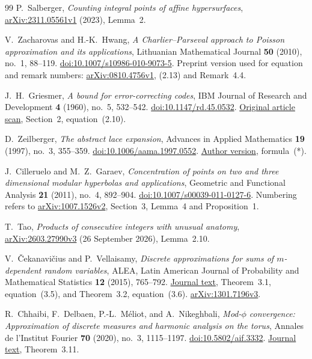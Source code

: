 \begin{thebibliography}{99}
P.~Salberger,
\emph{Counting integral points of affine hypersurfaces},
\href{https://arxiv.org/abs/2311.05561v1}
{arXiv:2311.05561v1} (2023), Lemma~2.

V.~Zacharovas and H.-K.~Hwang,
\emph{A Charlier--Parseval approach to Poisson approximation
and its applications},
Lithuanian Mathematical Journal \textbf{50} (2010), no.~1,
88--119.
\href{https://doi.org/10.1007/s10986-010-9073-5}
{doi:10.1007/s10986-010-9073-5}.
Preprint version used for equation and remark numbers:
\href{https://arxiv.org/abs/0810.4756v1}
{arXiv:0810.4756v1}, (2.13) and Remark~4.4.

J.~H.~Griesmer,
\emph{A bound for error-correcting codes},
IBM Journal of Research and Development \textbf{4} (1960),
no.~5, 532--542.
\href{https://doi.org/10.1147/rd.45.0532}
{doi:10.1147/rd.45.0532}.
\href{https://bitsavers.trailing-edge.com/pdf/ibm/IBM_Journal_of_Research_and_Development/045/ibmrd0405M.pdf}
{Original article scan}, Section~2, equation~(2.10).

D.~Zeilberger,
\emph{The abstract lace expansion},
Advances in Applied Mathematics \textbf{19} (1997),
no.~3, 355--359.
\href{https://doi.org/10.1006/aama.1997.0552}
{doi:10.1006/aama.1997.0552}.
\href{https://sites.math.rutgers.edu/~zeilberg/mamarim/mamarimPDF/lace.pdf}
{Author version}, formula~(*).

J.~Cilleruelo and M.~Z.~Garaev,
\emph{Concentration of points on two and three dimensional
modular hyperbolas and applications},
Geometric and Functional Analysis \textbf{21} (2011),
no.~4, 892--904.
\href{https://doi.org/10.1007/s00039-011-0127-6}
{doi:10.1007/s00039-011-0127-6}.
Numbering refers to
\href{https://arxiv.org/abs/1007.1526v2}{arXiv:1007.1526v2},
Section~3, Lemma~4 and Proposition~1.

T.~Tao,
\emph{Products of consecutive integers with unusual anatomy},
\href{https://arxiv.org/abs/2603.27990v3}{arXiv:2603.27990v3}
(26 September 2026), Lemma~2.10.

V.~\v{C}ekanavi\v{c}ius and P.~Vellaisamy,
\emph{Discrete approximations for sums of $m$-dependent random variables},
ALEA, Latin American Journal of Probability and Mathematical Statistics
\textbf{12} (2015), 765--792.
\href{https://alea.impa.br/articles/v12/12-29.pdf}{Journal text},
Theorem~3.1, equation~(3.5), and Theorem~3.2, equation~(3.6).
\href{https://arxiv.org/abs/1301.7196v3}{arXiv:1301.7196v3}.

R.~Chhaibi, F.~Delbaen, P.-L.~M\'eliot, and A.~Nikeghbali,
\emph{Mod-$\phi$ convergence: Approximation of discrete measures
and harmonic analysis on the torus},
Annales de l'Institut Fourier \textbf{70} (2020),
no.~3, 1115--1197.
\href{https://doi.org/10.5802/aif.3332}{doi:10.5802/aif.3332}.
\href{https://numdam.org/item/10.5802/aif.3332.pdf}{Journal text},
Theorem~3.11.

\end{thebibliography}
